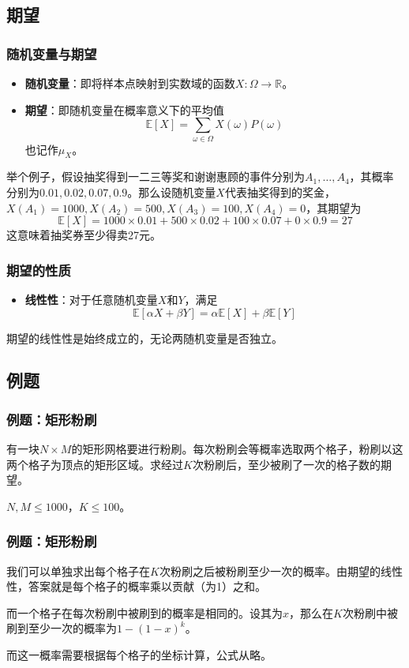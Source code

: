 \documentclass[9pt,dvipsnames]{beamer}
\begin{document}
\subsection{期望}
\begin{frame}
	\frametitle{随机变量与期望}
	\begin{itemize}
		\item \textbf{随机变量}：即将样本点映射到实数域的函数$X:\Omega\rightarrow\mathbb{R}$。
		\item \textbf{期望}：即随机变量在概率意义下的平均值
			\[ \mathbb{E}[X]=\sum_{\omega\in\Omega} X(\omega)P(\omega) \]
			也记作$\mu_X$。
	\end{itemize}

	举个例子，假设抽奖得到一二三等奖和谢谢惠顾的事件分别为$A_1,\ldots,A_4$，其概率分别为$0.01,0.02,0.07,0.9$。那么设随机变量$X$代表抽奖得到的奖金，$X(A_1)=1000,X(A_2)=500,X(A_3)=100,X(A_4)=0$，其期望为
	\[ \mathbb{E}[X] = 1000\times0.01 + 500\times0.02 + 100\times0.07 + 0\times 0.9 = 27 \]
	这意味着抽奖券至少得卖27元。
\end{frame}
\begin{frame}
	\frametitle{期望的性质}
	\begin{itemize}
		\item \textbf{线性性}：对于任意随机变量$X$和$Y$，满足
			\[ \mathbb{E}[\alpha X+\beta Y] = \alpha\mathbb{E}[X] + \beta\mathbb{E}[Y] \]
	\end{itemize}
	期望的线性性是始终成立的，无论两随机变量是否独立。
\end{frame}

\subsection{例题}
\begin{frame}
	\frametitle{例题：矩形粉刷}
	有一块$N\times M$的矩形网格要进行粉刷。每次粉刷会等概率选取两个格子，粉刷以这两个格子为顶点的矩形区域。求经过$K$次粉刷后，至少被刷了一次的格子数的期望。

	$N,M\leq 1000$，$K\leq 100$。
\end{frame}
\begin{frame}
	\frametitle{例题：矩形粉刷}
	我们可以单独求出每个格子在$K$次粉刷之后被粉刷至少一次的概率。由期望的线性性，答案就是每个格子的概率乘以贡献（为1）之和。\pause

	而一个格子在每次粉刷中被刷到的概率是相同的。设其为$x$，那么在$K$次粉刷中被刷到至少一次的概率为$1-(1-x)^k$。

	而这一概率需要根据每个格子的坐标计算，公式从略。
\end{frame}
\end{document}
